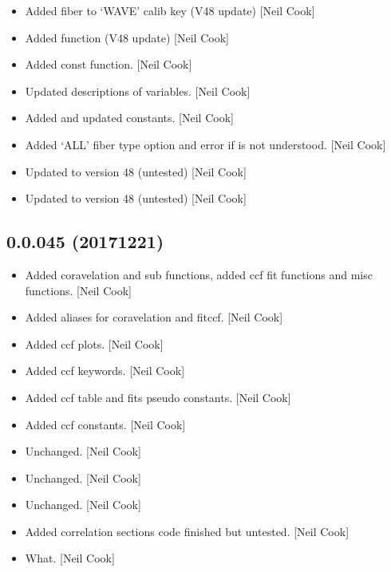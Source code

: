 \documentclass[a4paper,10pt,english]{report}
\begin{document}
\begin{itemize}
\item {} 
Added fiber to ‘WAVE’ calib key (V48 update) {[}Neil Cook{]}

\item {} 
Added  function (V48 update) {[}Neil Cook{]}

\item {} 
Added  const function. {[}Neil Cook{]}

\item {} 
Updated descriptions of  variables. {[}Neil Cook{]}

\item {} 
Added and updated  constants. {[}Neil Cook{]}

\item {} 
Added ‘ALL’ fiber type option and error if  is not
understood. {[}Neil Cook{]}

\item {} 
Updated to version 48 (untested) {[}Neil Cook{]}

\item {} 
Updated to version 48 (untested) {[}Neil Cook{]}

\end{itemize}


\subsection{0.0.045 (2017\sphinxhyphen{}12\sphinxhyphen{}21)}
\label{\detokenize{misc/changelog:id526}}\begin{itemize}
\item {} 
Added coravelation and sub functions, added ccf fit functions and misc
functions. {[}Neil Cook{]}

\item {} 
Added aliases for coravelation and fitccf. {[}Neil Cook{]}

\item {} 
Added ccf plots. {[}Neil Cook{]}

\item {} 
Added ccf keywords. {[}Neil Cook{]}

\item {} 
Added ccf table and fits pseudo constants. {[}Neil Cook{]}

\item {} 
Added ccf constants. {[}Neil Cook{]}

\item {} 
Unchanged. {[}Neil Cook{]}

\item {} 
Unchanged. {[}Neil Cook{]}

\item {} 
Unchanged. {[}Neil Cook{]}

\item {} 
Added correlation sections \sphinxhyphen{} code finished but untested. {[}Neil Cook{]}

\item {} 
What. {[}Neil Cook{]}

\end{itemize}
\end{document}
